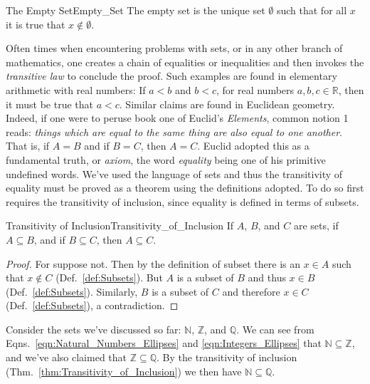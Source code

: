         \begin{fdefinition}{The Empty Set}{Empty_Set}
            The \gls{empty set} is the unique \gls{set} $\emptyset$ such that
            for all $x$ it is true that $x\notin\emptyset$.
        \end{fdefinition}
        Often times when encountering problems with sets, or in any other branch
        of mathematics, one creates a chain of equalities or inequalities and
        then invokes the \textit{transitive law} to conclude the proof. Such
        examples are found in elementary arithmetic with real numbers: If $a<b$
        and $b<c$, for real numbers $a,b,c\in\mathbb{R}$, then it must be true
        that $a<c$. Similar claims are found in Euclidean geometry. Indeed, if
        one were to peruse book one of Euclid's
        \textit{Elements}, common notion 1 reads:
        \textit{things which are equal to the same thing are also equal to one
        another}. That is, if $A=B$ and if $B=C$, then $A=C$. Euclid adopted
        this as a fundamental truth, or \textit{axiom}, the word
        \textit{equality} being one of his primitive undefined words. We've used
        the language of sets and thus the transitivity of equality must be
        proved as a theorem using the definitions adopted. To do so first
        requires the transitivity of inclusion, since equality is defined in
        terms of subsets.
        \begin{ltheorem}{Transitivity of Inclusion}{Transitivity_of_Inclusion}
            If $A$, $B$, and $C$ are sets, if $A\subseteq{B}$, and if
            $B\subseteq{C}$, then $A\subseteq{C}$.
        \end{ltheorem}
        \begin{proof}
            For suppose not. Then by the definition of subset there is an
            $x\in{A}$ such that $x\notin{C}$ (Def.~\ref{def:Subsets}). But $A$
            is a subset of $B$ and thus $x\in{B}$ (Def.~\ref{def:Subsets}).
            Similarly, $B$ is a subset of $C$ and therefore $x\in{C}$
            (Def.~\ref{def:Subsets}), a contradiction.
        \end{proof}
        \begin{example}
            Consider the sets we've discussed so far: $\mathbb{N}$,
            $\mathbb{Z}$, and $\mathbb{Q}$. We can see from
            Eqns.~\ref{eqn:Natural_Numbers_Ellipses} and
            \ref{eqn:Integers_Ellipses} that $\mathbb{N}\subseteq\mathbb{Z}$,
            and we've also claimed that $\mathbb{Z}\subseteq\mathbb{Q}$. By the
            transitivity of inclusion (Thm.~\ref{thm:Transitivity_of_Inclusion})
            we then have $\mathbb{N}\subseteq\mathbb{Q}$.
        \end{example}
